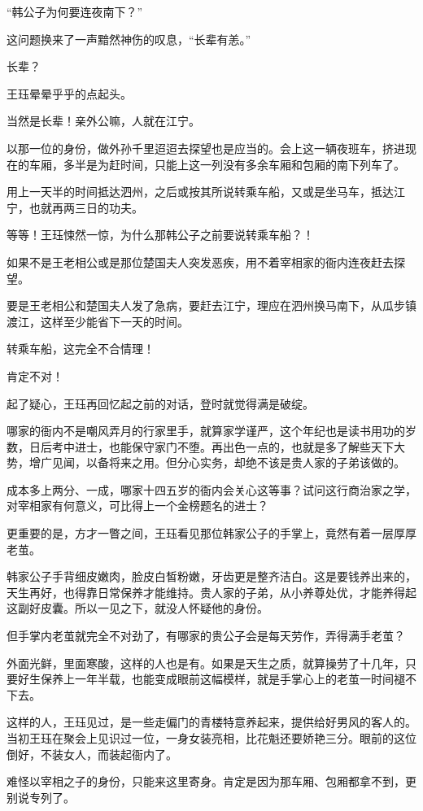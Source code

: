 “韩公子为何要连夜南下？”

这问题换来了一声黯然神伤的叹息，“长辈有恙。”

长辈？

王珏晕晕乎乎的点起头。

当然是长辈！亲外公嘛，人就在江宁。

以那一位的身份，做外孙千里迢迢去探望也是应当的。会上这一辆夜班车，挤进现在的车厢，多半是为赶时间，只能上这一列没有多余车厢和包厢的南下列车了。

用上一天半的时间抵达泗州，之后或按其所说转乘车船，又或是坐马车，抵达江宁，也就再两三日的功夫。

等等！王珏悚然一惊，为什么那韩公子之前要说转乘车船？！

如果不是王老相公或是那位楚国夫人突发恶疾，用不着宰相家的衙内连夜赶去探望。

要是王老相公和楚国夫人发了急病，要赶去江宁，理应在泗州换马南下，从瓜步镇渡江，这样至少能省下一天的时间。

转乘车船，这完全不合情理！

肯定不对！

起了疑心，王珏再回忆起之前的对话，登时就觉得满是破绽。

哪家的衙内不是嘲风弄月的行家里手，就算家学谨严，这个年纪也是读书用功的岁数，日后考中进士，也能保守家门不堕。再出色一点的，也就是多了解些天下大势，增广见闻，以备将来之用。但分心实务，却绝不该是贵人家的子弟该做的。

成本多上两分、一成，哪家十四五岁的衙内会关心这等事？试问这行商治家之学，对宰相家有何意义，可比得上一个金榜题名的进士？

更重要的是，方才一瞥之间，王珏看见那位韩家公子的手掌上，竟然有着一层厚厚老茧。

韩家公子手背细皮嫩肉，脸皮白皙粉嫩，牙齿更是整齐洁白。这是要钱养出来的，天生再好，也得靠日常保养才能维持。贵人家的子弟，从小养尊处优，才能养得起这副好皮囊。所以一见之下，就没人怀疑他的身份。

但手掌内老茧就完全不对劲了，有哪家的贵公子会是每天劳作，弄得满手老茧？

外面光鲜，里面寒酸，这样的人也是有。如果是天生之质，就算操劳了十几年，只要好生保养上一年半载，也能变成眼前这幅模样，就是手掌心上的老茧一时间褪不下去。

这样的人，王珏见过，是一些走偏门的青楼特意养起来，提供给好男风的客人的。当初王珏在聚会上见识过一位，一身女装亮相，比花魁还要娇艳三分。眼前的这位倒好，不装女人，而装起衙内了。

难怪以宰相之子的身份，只能来这里寄身。肯定是因为那车厢、包厢都拿不到，更别说专列了。

